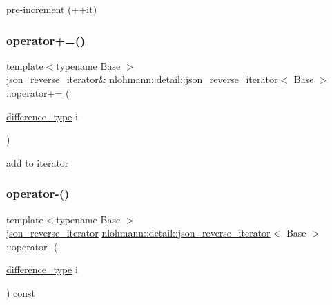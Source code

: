 pre-\/increment (++it) 

\mbox{\label{classnlohmann_1_1detail_1_1json__reverse__iterator_a4e5d0a3bee433104ef87366e00536e01}} 
\subsubsection{\texorpdfstring{operator+=()}{operator+=()}}
{\footnotesize\ttfamily template$<$typename Base $>$ \\
\mbox{\hyperlink{classnlohmann_1_1detail_1_1json__reverse__iterator}{json\+\_\+reverse\+\_\+iterator}}\& \mbox{\hyperlink{classnlohmann_1_1detail_1_1json__reverse__iterator}{nlohmann\+::detail\+::json\+\_\+reverse\+\_\+iterator}}$<$ Base $>$\+::operator+= (\begin{DoxyParamCaption}\item[{\mbox{\hyperlink{classnlohmann_1_1detail_1_1json__reverse__iterator_a9ab55987c05ec6427ad36082e351cc45}{difference\+\_\+type}}}]{i }\end{DoxyParamCaption})\hspace{0.3cm}{\ttfamily [inline]}}



add to iterator 

\mbox{\label{classnlohmann_1_1detail_1_1json__reverse__iterator_a549c6eb10b6434eaf772f71d129a6d79}} 
\subsubsection{\texorpdfstring{operator-\/()}{operator-()}\hspace{0.1cm}{\footnotesize\ttfamily [1/2]}}
{\footnotesize\ttfamily template$<$typename Base $>$ \\
\mbox{\hyperlink{classnlohmann_1_1detail_1_1json__reverse__iterator}{json\+\_\+reverse\+\_\+iterator}} \mbox{\hyperlink{classnlohmann_1_1detail_1_1json__reverse__iterator}{nlohmann\+::detail\+::json\+\_\+reverse\+\_\+iterator}}$<$ Base $>$\+::operator-\/ (\begin{DoxyParamCaption}\item[{\mbox{\hyperlink{classnlohmann_1_1detail_1_1json__reverse__iterator_a9ab55987c05ec6427ad36082e351cc45}{difference\+\_\+type}}}]{i }\end{DoxyParamCaption}) const\hspace{0.3cm}{\ttfamily [inline]}}



